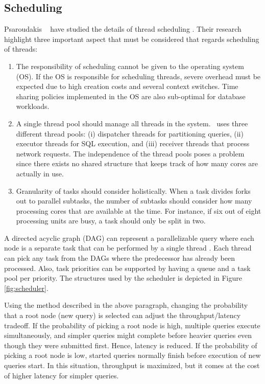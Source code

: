 \subsection{Scheduling}
\label{sub:Scheduling}
Psaroudakis \ea~ have studied the details of thread scheduling \cite{Psaroudakis2013-fn}. Their research highlight three important aspect that must be considered that regards scheduling of threads:
\begin{enumerate}
  \item The responsibility of scheduling cannot be given to the operating system (OS). If the OS is responsible for scheduling threads, severe overhead must be expected due to high creation costs and several context switches. Time sharing policies implemented in the OS are also sub-optimal for database workloads.
  \item A single thread pool should manage all threads in the system. \saph~uses three different thread pools: (i) dispatcher threads for partitioning queries, (ii) executor threads for SQL execution, and (iii) receiver threads that process network requests. The independence of the thread pools poses a problem since there exists no shared structure that keeps track of how many cores are actually in use.
  \item Granularity of tasks should consider holistically. When a task divides forks out to parallel subtasks, the number of subtasks should consider how many processing cores that are available at the time. For instance, if six out of eight processing units are busy, a task should only be split in two.
\end{enumerate}

A directed acyclic graph (DAG) can represent a parallelizable query where each node is a separate task that can be performed by a single thread \cite{Psaroudakis2013-fn}. Each thread can pick any task from the DAGs where the predecessor has already been processed. Also, task priorities can be supported by having a queue and a task pool per priority. The structures used by the scheduler is depicted in Figure \ref{fig:scheduler}.

Using the method described in the above paragraph, changing the probability that a root node (new query) is selected can adjust the throughput/latency tradeoff. If the probability of picking a root node is high, multiple queries execute simultaneously, and simpler queries might complete before heavier queries even though they were submitted first. Hence, latency is reduced. If the probability of picking a root node is low, started queries normally finish before execution of new queries start. In this situation, throughput is maximized, but it comes at the cost of higher latency for simpler queries.

